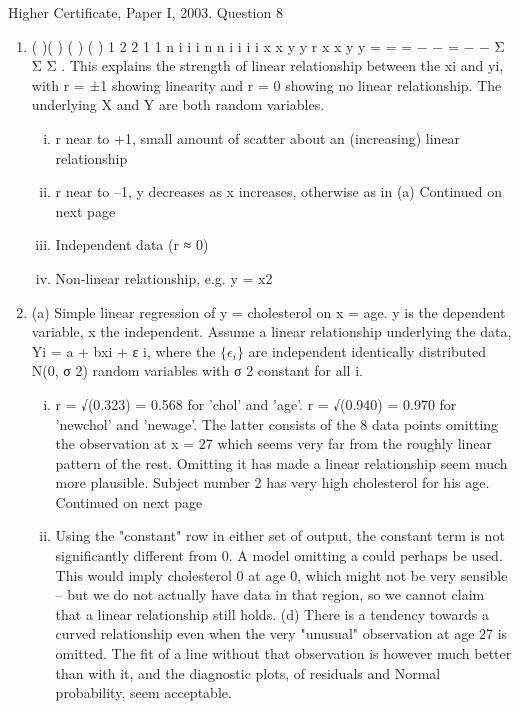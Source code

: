 \documentclass[a4paper,12pt]{article}
\begin{document}
Higher Certificate, Paper I, 2003. Question 8

\begin{enumerate}
\item ( )( )
( ) ( )
1
2 2
1 1
n
i i
i
n n
i i
i i
x x y y
r
x x y y
=
= =
− −
=
− −
Σ
Σ Σ
.
This explains the strength of linear relationship between the xi and yi, with
r = ±1 showing linearity and r = 0 showing no linear relationship. The
underlying X and Y are both random variables.
\begin{enumerate}[(i)]
\item r near to +1, small amount of scatter about an (increasing) linear
relationship
\item  r near to –1, y decreases as x increases, otherwise as in (a)
Continued on next page
\item  Independent data (r ≈ 0)
\item Non-linear relationship, e.g. y = x2
\end{enumerate}
\item  (a) Simple linear regression of y = cholesterol on x = age. y is the
dependent variable, x the independent. Assume a linear relationship
underlying the data, Yi = a + bxi + ε
i, where the $\{ \epsilon_i\}$
 are independent
identically distributed N(0, σ 2) random variables with σ 2 constant for
all i.
\begin{enumerate}[(i)]
\item r = √(0.323) = 0.568 for 'chol' and 'age'.
r = √(0.940) = 0.970 for 'newchol' and 'newage'.
The latter consists of the 8 data points omitting the observation at
x = 27 which seems very far from the roughly linear pattern of the rest.
Omitting it has made a linear relationship seem much more plausible.
Subject number 2 has very high cholesterol for his age.
Continued on next page
\item Using the "constant" row in either set of output, the constant term is
not significantly different from 0. A model omitting a could perhaps
be used.
This would imply cholesterol 0 at age 0, which might not be very
sensible – but we do not actually have data in that region, so we
cannot claim that a linear relationship still holds.
(d) There is a tendency towards a curved relationship even when the very
"unusual" observation at age 27 is omitted. The fit of a line without
that observation is however much better than with it, and the
diagnostic plots, of residuals and Normal probability, seem acceptable.
\end{enumerate}

\end{enumerate}
\end{document}
